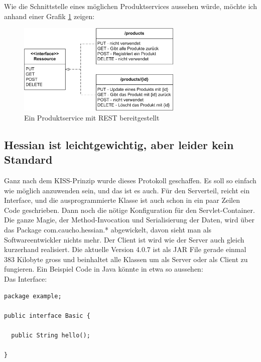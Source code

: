 \documentclass[abstracton, listof=totocnumbered,
bibliography=totocnumbered]{scrreprt}
\begin{document}
  Wie die Schnittstelle eines möglichen Produktservices aussehen würde, möchte
  ich anhand einer Grafik \ref{restPrinzip} zeigen:
  
  \begin{figure}[h]
      \begin{center}
          \includegraphics[width=0.7\textwidth]{./image/rest.png}
          \caption{Ein Produktservice mit REST bereitgestellt}
          \label{restPrinzip}
      \end{center}
  \end{figure}
  
  \subsection{Hessian ist leichtgewichtig, aber leider kein Standard}
  
  Ganz nach dem KISS-Prinzip\cite{KISS} wurde dieses Protokoll geschaffen. Es
  soll so einfach wie möglich anzuwenden sein, und das ist es auch. Für den
  Serverteil, reicht ein Interface, und die ausprogrammierte Klasse ist auch
  schon in ein paar Zeilen Code geschrieben. Dann noch die nötige Konfiguration
  für den Servlet-Container. Die ganze Magie, der Method-Invocation und
  Serialisierung der Daten, wird über das Package com.caucho.hessian.*
  abgewickelt, davon sieht man als Softwareentwickler nichts mehr. Der Client
  ist wird wie der Server auch gleich kurzerhand realisiert. Die aktuelle
  Version 4.0.7 ist als JAR File gerade einmal 383 Kilobyte gross und
  beinhaltet alle Klassen um als Server oder als Client zu fungieren. Ein
  Beispiel Code in Java könnte in etwa so aussehen:\\

  Das Interface:
  
\begin{verbatim}
package example;  

public interface Basic {

  public String hello();
  
}
\end{verbatim}
\end{document}
